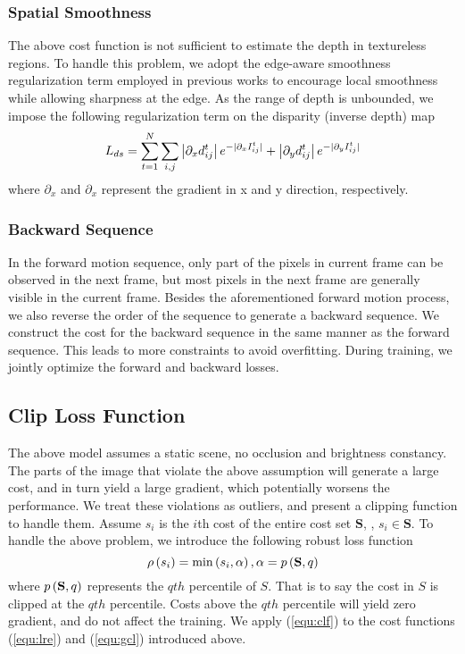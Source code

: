 \documentclass[10pt,twocolumn,letterpaper]{article}
\begin{document}
\subsubsection{Spatial Smoothness}
The above cost function is not sufficient to estimate the depth in textureless regions. To handle this problem, we adopt the edge-aware smoothness regularization term employed in previous works \cite{godard2017unsupervised,mahjourian2018unsupervised,zou2018df} to encourage local smoothness while allowing sharpness at the edge. As the range of depth is unbounded, we impose the following regularization term on the disparity (inverse depth) map
\begin{equation}{\label{equ:lds}}{L_{ds}} = \sum\limits_{t = 1}^N {\sum\limits_{i,j} {\left| {{\partial _x}d_{ij}^t} \right|{e^{ - |{\partial _x}I_{ij}^t|}} + \left| {{\partial _y}d_{ij}^t} \right|{e^{ - |{\partial _y}I_{ij}^t|}}} } 
\end{equation}
where ${{\partial }_{x}}$ and ${{\partial }_{x}}$ represent the gradient in x and y direction, respectively.

\subsubsection{Backward Sequence}
In the forward motion sequence, only part of the pixels in current frame can be observed in the next frame, but most pixels in the next frame are generally visible in the current frame. Besides the aforementioned forward motion process, we also reverse the order of the sequence to generate a backward sequence. We construct the cost for the backward sequence in the same manner as the forward sequence. This leads to more constraints to avoid overfitting. During training, we jointly optimize the forward and backward losses. 

\subsection{Clip Loss Function}

The above model assumes a static scene, no occlusion and brightness constancy. The parts of the image that violate the above assumption will generate a large cost, and in turn yield a large gradient, which potentially worsens the performance. We treat these violations as outliers, and present a clipping function to handle them. Assume ${{s}_{i}}$ is the $i$th cost of the entire cost set $\mathbf{S}$, \ie, ${{s}_{i}}\in \mathbf{S}$.  To handle the above problem, we introduce the following robust loss function
\begin{equation} \label{equ:clf}
	\rho \left( {{s_i}} \right) = \min \left( {{s_i},\alpha } \right),\alpha  = p\left( {{\bf{S}},q} \right)
\end{equation}
where  $p\left( {{\bf{S}},q} \right)$ represents the  $qth$ percentile of  $S$. That is to say the cost in  $S$ is clipped at the $qth$ percentile. Costs above the $qth$ percentile will yield zero gradient, and do not affect the training. We apply (\ref{equ:clf}) to the cost functions (\ref{equ:lre}) and (\ref{equ:gcl})  introduced above.
\end{document}
